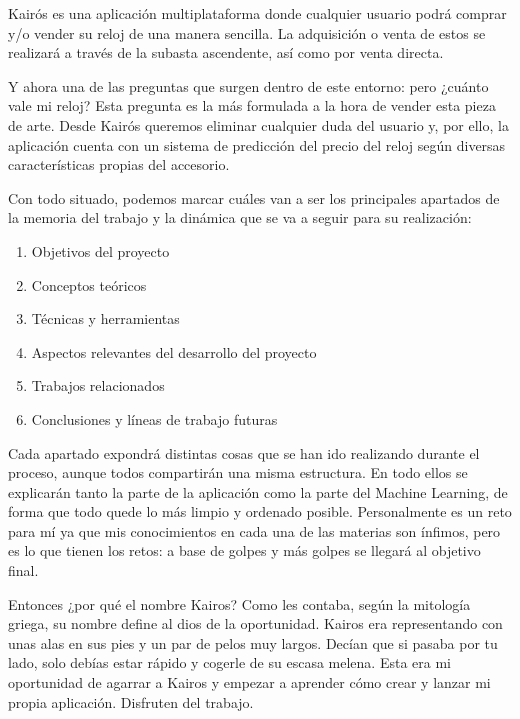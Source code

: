 Kairós es una aplicación multiplataforma donde cualquier usuario podrá comprar y/o vender su reloj de una manera sencilla. La adquisición o venta de estos se realizará a través de la subasta ascendente, así como por venta directa.

Y ahora una de las preguntas que surgen dentro de este entorno: pero ¿cuánto vale mi reloj? Esta pregunta es la más formulada a la hora de vender esta pieza de arte. Desde Kairós queremos eliminar cualquier duda del usuario y, por ello, la aplicación cuenta con un sistema de predicción del precio del reloj según diversas características propias del accesorio.

Con todo situado, podemos marcar cuáles van a ser los principales apartados de la memoria del trabajo y la dinámica que se va a seguir para su realización:

\begin{enumerate}
	\item Objetivos del proyecto
	\item Conceptos teóricos
	\item Técnicas y herramientas
	\item Aspectos relevantes del desarrollo del proyecto
	\item Trabajos relacionados
	\item Conclusiones y líneas de trabajo futuras
\end{enumerate}

Cada apartado expondrá distintas cosas que se han ido realizando durante el proceso, aunque todos compartirán una misma estructura. En todo ellos se explicarán tanto la parte de la aplicación como la parte del Machine Learning, de forma que todo quede lo más limpio y ordenado posible. Personalmente es un reto para mí ya que mis conocimientos en cada una de las materias son ínfimos, pero es lo que tienen los retos: a base de golpes y más golpes se llegará al objetivo final.

Entonces ¿por qué el nombre Kairos? Como les contaba, según la mitología griega, su nombre define al dios de la oportunidad. Kairos era representando con unas alas en sus pies y un par de pelos muy largos. Decían que si pasaba por tu lado, solo debías estar rápido y cogerle de su escasa melena. Esta era mi oportunidad de agarrar a Kairos y empezar a aprender cómo crear y lanzar mi propia aplicación. Disfruten del trabajo.
